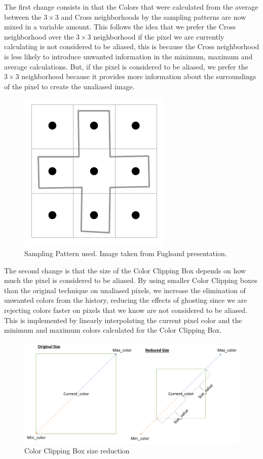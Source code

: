 \documentclass{cslthse-msc}
\begin{document}
The first change consists in that the Colors that were calculated from the average between the $3\times 3$ and Cross neighborhoods by the sampling patterns are now mixed in a variable amount. This follows the idea that we prefer the Cross neighborhood over the $3\times 3$ neighborhood if the pixel we are currently calculating is not considered to be aliased, this is because the Cross neighborhood is less likely to introduce unwanted information in the minimum, maximum and average calculations. But, if the pixel is considered to be aliased, we prefer the $3\times 3$ neighborhood because it provides more information about the surroundings of the pixel to create the unaliased image. 

\begin{figure}[!hbt]
	\centering
	\includegraphics[scale=0.3]{images/sampling_pattern.png}
	\caption{Sampling Pattern used. Image taken from Fuglsand presentation. \protect\cite{Fuglsand2016}}\label{fig:samplingpattern_2}
\end{figure}

The second change is that the size of the Color Clipping Box depends on how much the pixel is considered to be aliased. By using smaller Color Clipping boxes than the original technique on unaliased pixels, we increase the elimination of unwanted colors from the history, reducing the effects of ghosting since we are rejecting colors faster on pixels that we know are not considered to be aliased. This is implemented by linearly interpolating the current pixel color and the minimum and maximum colors calculated for the Color Clipping Box.

\begin{figure}[!hbt]
	\centering
	\includegraphics[scale=0.7]{images/clipping_box_reduction.png}
	\caption{Color Clipping Box size reduction}\label{fig:colorclippingboxredux}
\end{figure}
\end{document}
